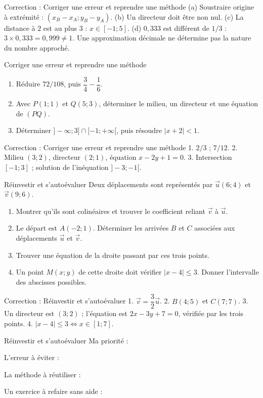 \documentclass[aspectratio=169,10pt]{beamer}
\begin{document}
\begin{frame}{Correction : Corriger une erreur et reprendre une méthode}
(a) Soustraire origine à extrémité : \((x_B-x_A;y_B-y_A)\). (b) Un directeur doit être non nul. (c) La distance à \(2\) est au plus \(3\) : \(x\in[-1;5]\). (d) \(0{,}333\) est différent de \(1/3\) : \(3\times0{,}333=0{,}999\ne1\). Une approximation décimale ne détermine pas la nature du nombre approché.
\end{frame}
\begin{frame}{Corriger une erreur et reprendre une méthode}
\begin{enumerate}
\setcounter{enumi}{0}
\item Réduire \(72/108\), puis \(\dfrac34-\dfrac16\).

\item Avec \(P(1;1)\) et \(Q(5;3)\), déterminer le milieu, un directeur et une équation de \((PQ)\).

\item Déterminer \(]-\infty;3]\cap[-1;+\infty[\), puis résoudre \(|x+2|<1\).

\end{enumerate}
\end{frame}
\begin{frame}{Correction : Corriger une erreur et reprendre une méthode}
1. \(2/3\) ; \(7/12\). 2. Milieu \((3;2)\), directeur \((2;1)\), équation \(x-2y+1=0\). 3. Intersection \([-1;3]\) ; solution de l'inéquation \(]-3;-1[\).
\end{frame}
\begin{frame}{Réinvestir et s'autoévaluer}
Deux déplacements sont représentés par \(\vec u(6;4)\) et \(\vec v(9;6)\).

\begin{enumerate}
\setcounter{enumi}{0}\item Montrer qu'ils sont colinéaires et trouver le coefficient reliant \(\vec v\) à \(\vec u\).

\item Le départ est \(A(-2;1)\). Déterminer les arrivées \(B\) et \(C\) associées aux déplacements \(\vec u\) et \(\vec v\).

\item Trouver une équation de la droite passant par ces trois points.

\item Un point \(M(x;y)\) de cette droite doit vérifier \(|x-4|\leq3\). Donner l'intervalle des abscisses possibles.

\end{enumerate}
\end{frame}
\begin{frame}{Correction : Réinvestir et s'autoévaluer}
1. \(\vec v=\dfrac32\vec u\). 2. \(B(4;5)\) et \(C(7;7)\). 3. Un directeur est \((3;2)\) ; l'équation est \(2x-3y+7=0\), vérifiée par les trois points. 4. \(|x-4|\leq3\iff x\in[1;7]\).
\end{frame}
\begin{frame}{Réinvestir et s'autoévaluer}
Ma priorité :  

L'erreur à éviter :  

La méthode à réutiliser :  

Un exercice à refaire sans aide :
\end{frame}
\end{document}
